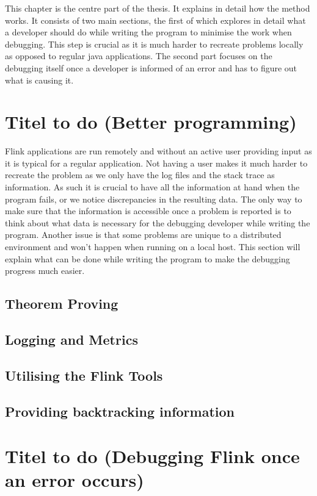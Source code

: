 
This chapter is the centre part of the thesis. It explains in detail how the method works. It consists of two main sections, the first of which explores in detail what a developer should do while writing the program to minimise the work when debugging. This step is crucial as it is much harder to recreate problems locally as opposed to regular java applications. The second part focuses on the debugging itself once a developer is informed of an error and has to figure out what is causing it.

\section{Titel to do (Better programming)}
Flink applications are run remotely and without an active user providing input as it is typical for a regular application. Not having a user makes it much harder to recreate the problem as we only have the log files and the stack trace as information. As such it is crucial to have all the information at hand when the program fails, or we notice discrepancies in the resulting data. The only way to make sure that the information is accessible once a problem is reported is to think about what data is necessary for the debugging developer while writing the program. Another issue is that some problems are unique to a distributed environment and won't happen when running on a local host. This section will explain what can be done while writing the program to make the debugging progress much easier.

\subsection{Theorem Proving}


\subsection{Logging and Metrics}
\subsection{Utilising the Flink Tools}
\subsection{Providing backtracking information}

\section{Titel to do (Debugging Flink once an error occurs)}
